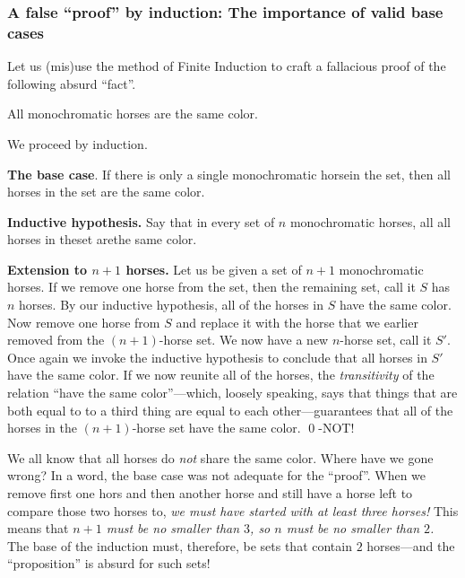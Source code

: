 \subsubsection{A false ``proof'' by induction: The importance of valid base cases}
\label{sec:false-induction}

Let us (mis)use the method of Finite Induction to craft a fallacious
proof of the following absurd ``fact''.

All monochromatic horses are the same color.

We proceed by induction.

\smallskip

{\bf The base case}.  If there is only a single monochromatic horsein
the set, then all horses in the set are the same color.

\smallskip

{\bf Inductive hypothesis.}  Say that in every set of $n$
monochromatic horses, all all horses in theset arethe same color.

\smallskip

{\bf Extension to $n+1$ horses.}
Let us be given a set of $n+1$ monochromatic horses.  If we remove one
horse from the set, then the remaining set, call it $S$ has $n$ horses.  By our
inductive hypothesis, all of the horses in $S$ have the same color.  Now
remove one horse from $S$ and replace it with the horse that we
earlier removed from the $(n+1)$-horse set.  We now have a new
$n$-horse set, call it $S'$.  Once again we invoke the inductive
hypothesis to conclude that all horses in $S'$ have the same color.
If we now reunite all of the horses, the {\em transitivity} of the
relation ``have the same color''---which, loosely speaking, says that
things that are both equal to to a third thing are equal to each
other---guarantees that all of the horses in the $(n+1)$-horse set
have the same color.  \qed-NOT!

\medskip

We all know that all horses do {\em not} share the same color.  Where
have we gone wrong?  In a word, the base case was not adequate for the
``proof''.  When we remove first one hors and then another horse and
still have a horse left to compare those two horses to, {\em we must
  have started with at least {\em three} horses!}  This means that
  {\em $n+1$ must be no smaller than $3$, so $n$ must be no smaller
    than $2$.}  The base of the induction must, therefore, be sets
  that contain $2$ horses---and the ``proposition'' is absurd for such sets!

